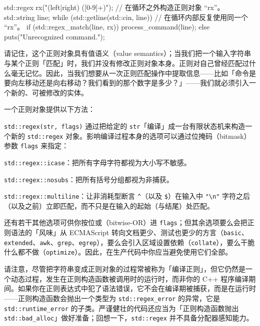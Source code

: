 \begin{codebox}[cpp]
     std::regex rx("(left|right) ([0-9]+)");
     // 在循环之外构造正则对象 “rx”。
     std::string line;
     while (std::getline(std::cin, line)) {
       // 在循环内部反复使用同一个 “rx”。
       if (std::regex_match(line, rx)) {
         process_command(line);
       } else {
         puts("Unrecognized command.");
       }
     }
\end{codebox}

请记住，这个正则对象具有值语义（value semantics）；当我们把一个输入字符串与某个正则「匹配」时，我们并没有修改正则对象本身。正则对自己曾经匹配过什么毫无记忆。因此，当我们想要从一次正则匹配操作中提取信息——比如「命令是要向左移动还是向右移动？我们看到的那个数字是多少？」——我们就必须引入一个新的、可被修改的实体。

一个正则对象提供以下方法：

\texttt{std::\allowbreak{}regex(\allowbreak{}str,\allowbreak{} flags)\allowbreak{}} 通过把给定的 \texttt{str}「编译」成一台有限状态机来构造一个新的 \texttt{std::\allowbreak{}regex} 对象。影响编译过程本身的选项可以通过位掩码（bitmask）参数 \texttt{flags} 来指定：

\texttt{std::\allowbreak{}regex::\allowbreak{}icase}：把所有字母字符都视为大小写不敏感。

\texttt{std::\allowbreak{}regex::\allowbreak{}nosubs}：把所有括号分组都视为非捕获。

\texttt{std::\allowbreak{}regex::\allowbreak{}multiline}：让非消耗型断言 \texttt{\textasciicircum{}}（以及 \texttt{\$}）在输入中 \texttt{"\textbackslash n"} 字符之后（以及之前）立即匹配，而不只是在输入的起始（与结尾）处匹配。

还有若干其他选项可供你按位或（bitwise-OR）进 \texttt{flags}；但其余选项要么会把正则语法的「风味」从 ECMAScript 转向文档更少、测试也更少的方言（\texttt{basic}、\texttt{extended}、\texttt{awk}、\texttt{grep}、\texttt{egrep}），要么会引入区域设置依赖（\texttt{collate}），要么干脆什么都不做（\texttt{optimize}）。因此，在生产代码中你应当避免使用它们全部。

请注意，尽管把字符串变成正则对象的过程常被称为「编译正则」，但它仍然是一个动态过程，发生在正则构造函数被调用时的运行时，而非你的 C++ 程序编译期间。如果你在正则表达式中犯了语法错误，它不会在编译期被捕获，而是在运行时——正则构造函数会抛出一个类型为 \texttt{std::\allowbreak{}regex\_\allowbreak{}error} 的异常，它是 \texttt{std::\allowbreak{}runtime\_\allowbreak{}error} 的子类。严谨健壮的代码还应当为「正则构造函数抛出 \texttt{std::\allowbreak{}bad\_\allowbreak{}alloc}」做好准备；回想一下，\texttt{std::\allowbreak{}regex} 并不具备分配器感知能力。

